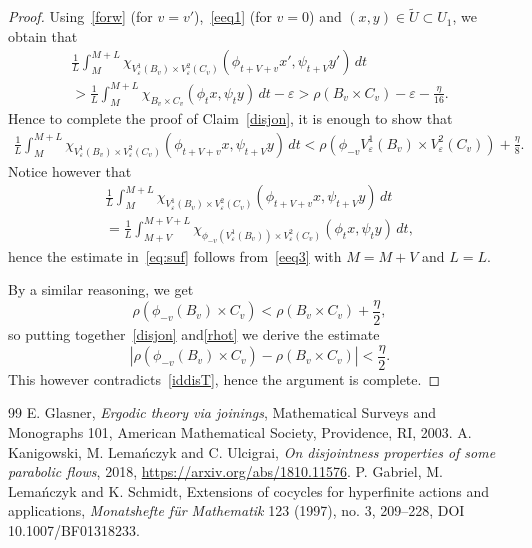 \documentclass[11pt]{article}
\let\epsilon\varepsilon
\theoremstyle{definition}
\theoremstyle{plain}
\begin{document}
\begin{proof}
Using~\eqref{forw} (for $v=v'$),~\eqref{eeq1} (for $v=0$) and $(x,y)\in \widetilde{U}\subset U_1$, we obtain that
\begin{multline*}
\frac{1}{L}\int_{M}^{M+L}\chi_{V^1_{\epsilon}(B_v)
\times V^2_{\epsilon}(C_v)}(\phi_{t+V+v}x',\psi_{t+V}y')\,dt \\ > \frac{1}{L}\int_{M}^{M+L}\chi_{B_v
\times C_v}(\phi_tx,\psi_ty)\,dt-\epsilon >
\rho(B_v\times C_v)-\epsilon-\frac{\eta}{16}.
\end{multline*}
Hence to complete the proof of Claim~\eqref{disjon}, it is enough to show that
\begin{multline}\label{eq:suf}
\frac{1}{L}\int_{M}^{M+L}\chi_{V^1_{\epsilon}(B_v)
\times
V^2_\epsilon(C_v)}(\phi_{t+V+v}x,\psi_{t+V}y)\,dt<
\rho(\phi_{-v}V^1_{\epsilon}(B_v)
\times V^2_\epsilon(C_v))+\frac{\eta}{8}.
\end{multline}
Notice however that
\begin{multline*}
\frac{1}{L}\int_{M}^{M+L}\chi_{V^1_{\epsilon}(B_v)
\times
V^2_\epsilon(C_v)}(\phi_{t+V+v}x,\psi_{t+V}y)\,dt \\ =\frac{1}{L}\int_{M+V}^{M+V+L}\chi_{\phi_{-v}(V^1_{\epsilon}(B_v))
\times
V^2_\epsilon(C_v)}(\phi_{t}x,\psi_{t}y)\,dt,
\end{multline*}
hence the estimate in~\eqref{eq:suf} follows from~\eqref{eeq3} with $M=M+V$ and $L=L$.

By a similar reasoning, we get
\begin{equation}\label{rhot}\rho(\phi_{-v}(B_v)\times C_v)<\rho(B_v\times C_v)+\frac{\eta}{2},
\end{equation}
so putting together~\eqref{disjon} and\eqref{rhot} we derive the estimate
\[|\rho(\phi_{-v}(B_v)\times C_v)-\rho(B_v\times C_v)|<\frac{\eta}{2}.\]
This however contradicts~\eqref{iddisT}, hence the argument is complete.
\end{proof}

\begin{thebibliography}{99}
 E. Glasner, \emph{Ergodic theory via joinings}, Mathematical Surveys and Monographs 101, American Mathematical Society, Providence, RI, 2003.
 A. Kanigowski, M. Lema\'nczyk and C. Ulcigrai, \emph{On disjointness properties of some parabolic flows}, 2018, \url{https://arxiv.org/abs/1810.11576}.
 P. Gabriel, M. Lema\'nczyk and K. Schmidt, Extensions of cocycles for hyperfinite actions and applications, \emph{Monatshefte f\"ur Mathematik} 123 (1997), no. 3, 209--228, DOI 10.1007/BF01318233.
\end{thebibliography}
\end{document}
